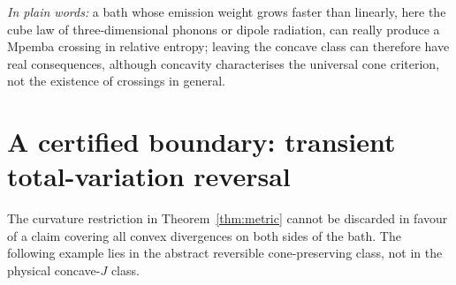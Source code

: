 \documentclass[11pt,a4paper]{article}
\theoremstyle{remark}\newtheorem{remark}[theorem]{Remark}
\newcommand{\takeaway}[1]{\par\smallskip\noindent\textit{In plain words:} #1\par\smallskip}
\begin{document}
\takeaway{a bath whose emission weight grows faster than linearly, here the cube law of three-dimensional phonons or dipole radiation, can really produce a Mpemba crossing in relative entropy; leaving the concave class can therefore have real consequences, although concavity characterises the universal cone criterion, not the existence of crossings in general.}

\section{A certified boundary: transient total-variation reversal}\label{sec:tv}
The curvature restriction in Theorem~\ref{thm:metric} cannot be discarded in favour of a claim covering all convex divergences on both sides of the bath. The following example lies in the abstract reversible cone-preserving class, not in the physical concave-$J$ class.
\end{document}
